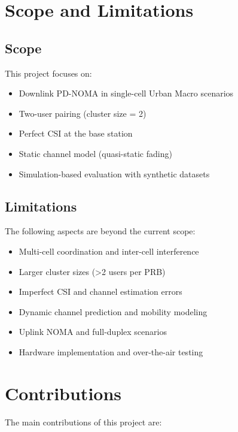 \section{Scope and Limitations}

\subsection{Scope}
This project focuses on:
\begin{itemize}
    \item Downlink PD-NOMA in single-cell Urban Macro scenarios
    \item Two-user pairing (cluster size = 2)
    \item Perfect CSI at the base station
    \item Static channel model (quasi-static fading)
    \item Simulation-based evaluation with synthetic datasets
\end{itemize}

\subsection{Limitations}
The following aspects are beyond the current scope:
\begin{itemize}
    \item Multi-cell coordination and inter-cell interference
    \item Larger cluster sizes (>2 users per PRB)
    \item Imperfect CSI and channel estimation errors
    \item Dynamic channel prediction and mobility modeling
    \item Uplink NOMA and full-duplex scenarios
    \item Hardware implementation and over-the-air testing
\end{itemize}

\section{Contributions}

The main contributions of this project are:

